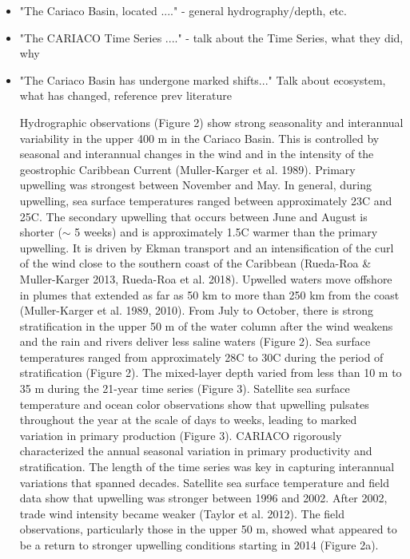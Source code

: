 \documentclass[draft]{agujournal2019}
\begin{document}
    \begin{itemize}
    
        
        \item "The Cariaco Basin, located ...." - general hydrography/depth, etc.
    
        \item "The CARIACO Time Series ...." - talk about the Time Series, what they did, why
    
        \item "The Cariaco Basin has undergone marked shifts..." Talk about ecosystem, what has changed, reference prev literature

        Hydrographic observations (Figure 2) show strong seasonality and interannual variability in the upper 400 m in the Cariaco Basin. This is controlled by seasonal and interannual changes in the wind and in the intensity of the geostrophic Caribbean Current (Muller-Karger et al. 1989). Primary upwelling was strongest between November and May. In general, during upwelling, sea surface temperatures ranged between approximately 23\degree C and 25\degree C. The secondary upwelling that occurs between June and August is shorter ($\sim$ 5 weeks) and is approximately 1.5\degree C warmer than the primary upwelling. It is driven by Ekman transport and an intensification of the curl of the wind close to the southern coast of the Caribbean (Rueda-Roa \& Muller-Karger 2013, Rueda-Roa et al. 2018). Upwelled waters move offshore in plumes that extended as far as 50 km to more than 250 km from the coast (Muller-Karger et al. 1989, 2010). From July to October, there is strong stratification in the upper 50 m of the water column after the wind weakens and the rain and rivers deliver less saline waters (Figure 2).
        Sea surface temperatures ranged from approximately 28\degree C to 30\degree C during the period of stratification (Figure 2). The mixed-layer depth varied from less than 10 m to 35 m during the 21-year time series (Figure 3). Satellite sea surface temperature and ocean color observations show that upwelling pulsates throughout the year at the scale of days to weeks, leading to marked variation in primary production (Figure 3). CARIACO rigorously characterized the annual seasonal variation in primary productivity and stratification. The length of the time series was key in capturing interannual variations that spanned decades. Satellite sea surface temperature and field data show that upwelling was stronger between 1996 and 2002. After 2002, trade wind intensity became weaker (Taylor et al. 2012).
        The field observations, particularly those in the upper 50 m, showed what appeared to be a return to stronger upwelling conditions starting in 2014 (Figure 2a).


\end{itemize}
\end{document}
